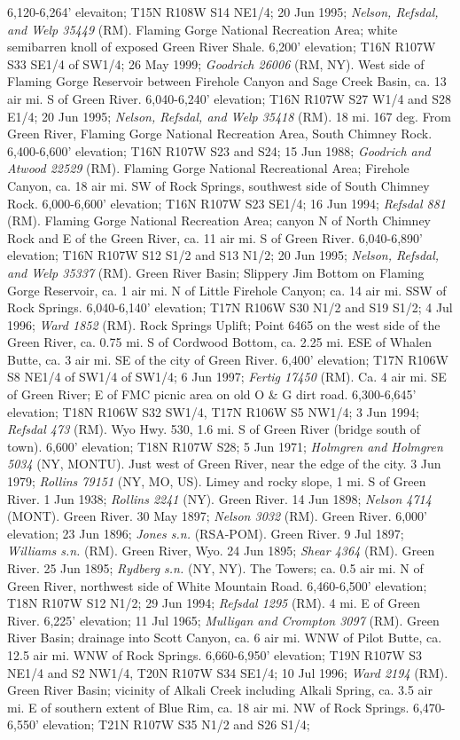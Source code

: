 6,120-6,264' elevaiton; T15N R108W S14 NE1/4; 20 Jun 1995; \textit{Nelson, Refsdal, and Welp 35449} (RM).  Flaming Gorge National Recreation Area; white semibarren knoll of exposed Green River Shale. 6,200' elevation; T16N R107W S33 SE1/4 of SW1/4; 26 May 1999; \textit{Goodrich 26006} (RM, NY).  West side of Flaming Gorge Reservoir between Firehole Canyon and Sage Creek Basin, ca. 13 air mi. S of Green River. 6,040-6,240' elevation; T16N R107W S27 W1/4 and S28 E1/4; 20 Jun 1995; \textit{Nelson, Refsdal, and Welp 35418} (RM).  18 mi. 167 deg. From Green River, Flaming Gorge National Recreation Area, South Chimney Rock. 6,400-6,600' elevation; T16N R107W S23 and S24; 15 Jun 1988; \textit{Goodrich and Atwood 22529} (RM).  Flaming Gorge National Recreational Area; Firehole Canyon, ca. 18 air mi. SW of Rock Springs, southwest side of South Chimney Rock. 6,000-6,600' elevation; T16N R107W S23 SE1/4; 16 Jun 1994; \textit{Refsdal 881} (RM).  Flaming Gorge National Recreation Area; canyon N of North Chimney Rock and E of the Green River, ca. 11 air mi. S of Green River. 6,040-6,890' elevation; T16N R107W S12 S1/2 and S13 N1/2; 20 Jun 1995; \textit{Nelson, Refsdal, and Welp 35337} (RM).  Green River Basin; Slippery Jim Bottom on Flaming Gorge Reservoir, ca. 1 air mi. N of Little Firehole Canyon; ca. 14 air mi. SSW of Rock Springs. 6,040-6,140' elevation; T17N R106W S30 N1/2 and S19 S1/2; 4 Jul 1996; \textit{Ward 1852} (RM).  Rock Springs Uplift; Point 6465 on the west side of the Green River, ca. 0.75 mi. S of Cordwood Bottom, ca. 2.25 mi. ESE of Whalen Butte, ca. 3 air mi. SE of the city of Green River. 6,400' elevation; T17N R106W S8 NE1/4 of SW1/4 of SW1/4; 6 Jun 1997; \textit{Fertig 17450} (RM).  Ca. 4 air mi. SE of Green River; E of FMC picnic area on old O \& G dirt road. 6,300-6,645' elevation; T18N R106W S32 SW1/4, T17N R106W S5 NW1/4; 3 Jun 1994; \textit{Refsdal 473} (RM).  Wyo Hwy. 530, 1.6 mi. S of Green River (bridge south of town). 6,600' elevation; T18N R107W S28; 5 Jun 1971; \textit{Holmgren and Holmgren 5034} (NY, MONTU).  Just west of Green River, near the edge of the city. 3 Jun 1979; \textit{Rollins 79151} (NY, MO, US).  Limey and rocky slope, 1 mi. S of Green River. 1 Jun 1938; \textit{Rollins 2241} (NY).  Green River. 14 Jun 1898; \textit{Nelson 4714} (MONT).  Green River. 30 May 1897; \textit{Nelson 3032} (RM).  Green River. 6,000' elevation; 23 Jun 1896; \textit{Jones s.n.} (RSA-POM).  Green River. 9 Jul 1897; \textit{Williams s.n.} (RM).  Green River, Wyo. 24 Jun 1895; \textit{Shear 4364} (RM).  Green River. 25 Jun 1895; \textit{Rydberg s.n.} (NY, NY).  The Towers; ca. 0.5 air mi. N of Green River, northwest side of White Mountain Road. 6,460-6,500' elevation; T18N R107W S12 N1/2; 29 Jun 1994; \textit{Refsdal 1295} (RM).  4 mi. E of Green River. 6,225' elevation; 11 Jul 1965; \textit{Mulligan and Crompton 3097} (RM).  Green River Basin; drainage into Scott Canyon, ca. 6 air mi. WNW of Pilot Butte, ca. 12.5 air mi. WNW of Rock Springs. 6,660-6,950' elevation; T19N R107W S3 NE1/4 and S2 NW1/4, T20N R107W S34 SE1/4; 10 Jul 1996; \textit{Ward 2194} (RM).  Green River Basin; vicinity of Alkali Creek including Alkali Spring, ca. 3.5 air mi. E of southern extent of Blue Rim, ca. 18 air mi. NW of Rock Springs. 6,470-6,550' elevation; T21N R107W S35 N1/2 and S26 S1/4; 